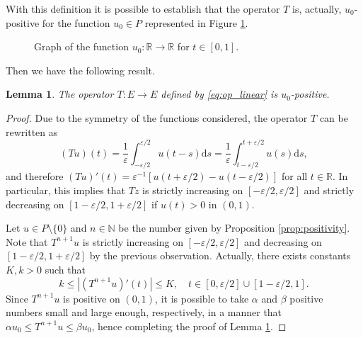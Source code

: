 \documentclass[a4paper,11pt]{article}
\theoremstyle{plain}
\newtheorem{lem}[thm]{Lemma}
\theoremstyle{definition}
\theoremstyle{definition}
\newcommand{\N}{\mathbb{N}}
\newcommand{\R}{\mathbb{R}}
\newcommand{\dd}{\mathrm{d}}
\numberwithin{equation}{section}
\begin{document}
With this definition it is possible to establish that the operator $T$ is, actually, $u_0$-positive for the function $u_0\in P$ represented in Figure \ref{fig:2}.

\begin{figure}[h]
    \centering
    \caption{Graph of the function $u_0\colon \R \to \R$ for $t\in[0,1]$.}
    \label{fig:2}
\end{figure}

Then we have the following result.
\begin{lem}\label{lem:u0-positive}
    The operator $T\colon E \to E$ defined by \eqref{eq:op_linear} is $u_0$-positive.
\end{lem}
\begin{proof}
Due to the symmetry of the functions considered, the operator $T$ can be rewritten as
\[
    (Tu)(t) = \frac{1}{\varepsilon} \int_{-\varepsilon/2}^{\varepsilon/2} u(t-s) \dd s = \frac{1}{\varepsilon} \int_{t-\varepsilon/2}^{t+\varepsilon/2} u(s)\dd s,
\]
and therefore $(Tu)'(t) = \varepsilon^{-1}[ u(t+\varepsilon/2) - u(t-\varepsilon/2) ]$ for all $t\in \R$. In particular, this implies that $Tz$ is strictly increasing on $[-\varepsilon/2,\varepsilon/2]$ and strictly decreasing on $[1-\varepsilon/2, 1+\varepsilon/2]$ if $u(t)>0$ in $(0,1)$.

Let $u\in P\setminus\{0\}$ and $n\in \N$ be the number given by Proposition \ref{prop:positivity}. Note that $T^{n+1}u$ is strictly increasing on $[-\varepsilon/2, \varepsilon/2]$ and decreasing on $[1-\varepsilon/2, 1+\varepsilon/2]$ by the previous observation. Actually, there exists constants $K,k>0$ such that
\[
    k \leq|(T^{n+1}u)'(t)| \leq K, \quad t\in[0,\varepsilon/2]\cup [1-\varepsilon/2,1].
\]
    Since $T^{n+1}u$ is positive on $(0,1)$, it is possible to take $\alpha$ and $\beta$ positive numbers small and large enough, respectively, in a manner that $\alpha u_0 \leq T^{n+1} u \leq \beta u_0$, hence completing the proof of Lemma \ref{lem:u0-positive}.
\end{proof}
\end{document}
